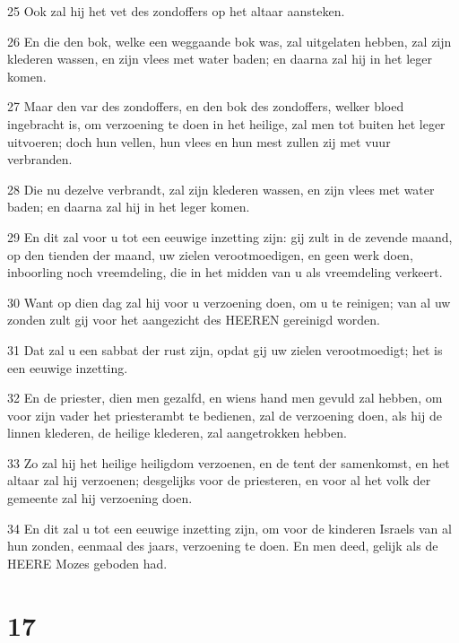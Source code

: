 \par 25 Ook zal hij het vet des zondoffers op het altaar aansteken.
\par 26 En die den bok, welke een weggaande bok was, zal uitgelaten hebben, zal zijn klederen wassen, en zijn vlees met water baden; en daarna zal hij in het leger komen.
\par 27 Maar den var des zondoffers, en den bok des zondoffers, welker bloed ingebracht is, om verzoening te doen in het heilige, zal men tot buiten het leger uitvoeren; doch hun vellen, hun vlees en hun mest zullen zij met vuur verbranden.
\par 28 Die nu dezelve verbrandt, zal zijn klederen wassen, en zijn vlees met water baden; en daarna zal hij in het leger komen.
\par 29 En dit zal voor u tot een eeuwige inzetting zijn: gij zult in de zevende maand, op den tienden der maand, uw zielen verootmoedigen, en geen werk doen, inboorling noch vreemdeling, die in het midden van u als vreemdeling verkeert.
\par 30 Want op dien dag zal hij voor u verzoening doen, om u te reinigen; van al uw zonden zult gij voor het aangezicht des HEEREN gereinigd worden.
\par 31 Dat zal u een sabbat der rust zijn, opdat gij uw zielen verootmoedigt; het is een eeuwige inzetting.
\par 32 En de priester, dien men gezalfd, en wiens hand men gevuld zal hebben, om voor zijn vader het priesterambt te bedienen, zal de verzoening doen, als hij de linnen klederen, de heilige klederen, zal aangetrokken hebben.
\par 33 Zo zal hij het heilige heiligdom verzoenen, en de tent der samenkomst, en het altaar zal hij verzoenen; desgelijks voor de priesteren, en voor al het volk der gemeente zal hij verzoening doen.
\par 34 En dit zal u tot een eeuwige inzetting zijn, om voor de kinderen Israels van al hun zonden, eenmaal des jaars, verzoening te doen. En men deed, gelijk als de HEERE Mozes geboden had.

\chapter{17}

